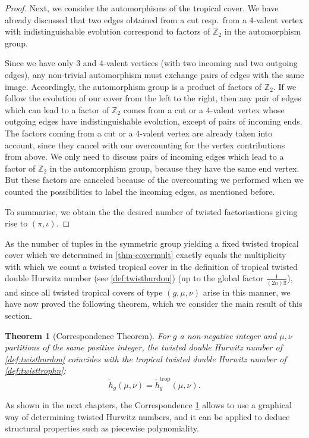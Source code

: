 \documentclass[10pt]{amsart}
\theoremstyle{plain}
\theoremstyle{definition}
\theoremstyle{definition}
\theoremstyle{plain}
\theoremstyle{plain}
\theoremstyle{remark}
\theoremstyle{plain}
\newtheorem{theo}[theo]{Theorem}
\theoremstyle{plain}
\DeclareMathOperator{\trop}{trop}
\begin{document}
\begin{proof}
Next, we consider the automorphisms of the tropical cover. We have already discussed that two edges obtained from a cut resp.\ from a $4$-valent vertex with indistinguishable evolution correspond to factors of $\mathbb{Z}_2$ in the  automorphism  group. 

Since we have only $3$ and $4$-valent vertices (with two incoming and two outgoing edges), any non-trivial automorphism  must exchange pairs of edges with the same image. Accordingly, the automorphism group is a product of factors of $\mathbb{Z}_2$. If we follow the evolution of our cover from the left to the right, then any pair of edges which can lead to a factor of $\mathbb{Z}_2$ comes from a cut or a $4$-valent vertex whose outgoing edges have indistinguishable evolution, except of pairs of incoming ends. The  factors coming from a cut or a $4$-valent vertex are already taken into account, since they cancel with our overcounting for the vertex contributions from above. We only need to discuss pairs of incoming edges which lead to a factor of $\mathbb{Z}_2$ in the automorphism group, because they have the same end vertex.
But these factors are canceled because of the overcounting we performed when we counted the possibilities to label the incoming edges, as mentioned before.

To summarise, we obtain the the desired number of twisted factorisations giving rise to $(\pi,\iota)$.
\end{proof}

As the number of tuples in the symmetric group yielding a fixed twisted tropical cover which we determined in \cref{thm-covermult} exactly equals the multiplicity with which we count a twisted tropical cover in the definition of tropical twisted double Hurwitz number (see \cref{def:twisthurdou}) (up to the global factor $\frac{1}{(2n)!!}$), and since all twisted tropical covers of type $(g,\mu,\nu)$ arise in this manner, we have now proved the following theorem, which we consider the main result of this section.

\begin{theo}[Correspondence Theorem]
\label{thm-corres}
For $g$ a non-negative integer and $\mu,\nu$ partitions of the same positive integer, the twisted double Hurwitz number of \cref{def:twisthurdou} coincides with the tropical twisted double Hurwitz number of \cref{def:twisttrophn}:
$$\tilde{h}_g(\mu,\nu)=\tilde{h}^{\trop}_g(\mu,\nu).$$
\end{theo}

As shown in the next chapters, the Correspondence \cref{thm-corres} allows to use a graphical way of determining twisted Hurwitz numbers, and it can be applied to deduce structural properties such as piecewise polynomiality.
\end{document}
